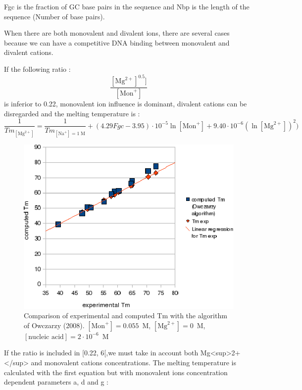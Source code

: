 \documentclass{article}
\begin{document}
Fgc is the fraction of GC base pairs in the sequence and 
Nbp is the length of the sequence (Number of base pairs).

When there are both monovalent and divalent ions, there are several cases because we can have
a competitive DNA binding between monovalent and divalent 
cations.

If the following ratio :
\begin{displaymath}
  \frac{[\mbox{Mg}^{2+}]^{0.5}]}{[\mbox{Mon}^+]}  
\end{displaymath}
is inferior to 0.22, monovalent ion influence is dominant, divalent cations can be 
disregarded and the melting temperature is :
\begin{displaymath}
\frac{1}{Tm_{[\mbox{Mg}^{2+}]}} = \frac{1}{Tm_{[\mbox{Na}^+]=1\;\mathrm{M}}} + (4.29
Fgc - 3.95)\cdot{}10^{-5} \ln [\mbox{Mon}^+] + 9.40\cdot{}10^{-6} (\ln [\mbox{Mg}^{2+}])^{2})
\end{displaymath}
  
\begin{figure}
\caption{Comparison of experimental and computed Tm with the algorithm of Owczarzy (2008). 
$[\mbox{Mon}^+] = 0.055$~M, $[\mbox{Mg}^{2+}] = 0$~M, $[\mbox{nucleic acid}] =
2\cdot{}10^{-6}$~M}
\includegraphics{Owczarzy2.eps}
\end{figure}


If the ratio is included in [0.22, 6[,we must take in account both Mg<sup>2+</sup> and monovalent cations 
concentrations. The melting temperature is calculated with the first equation but with monovalent 
ions concentration dependent parameters a, d and g :
\end{document}
